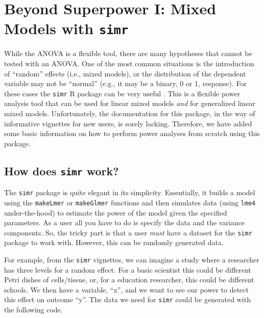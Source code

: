 \documentclass[
]{book}
\begin{document}
\hypertarget{beyond-superpower-i-mixed-models-with-simr}{%
\chapter{\texorpdfstring{Beyond Superpower I: Mixed Models with \texttt{simr}}{Beyond Superpower I: Mixed Models with simr}}\label{beyond-superpower-i-mixed-models-with-simr}}

While the ANOVA is a flexible tool, there are many hypotheses that cannot be tested with an ANOVA. One of the most common situations is the introduction of ``random'' effects (i.e., mixed models), or the distribution of the dependent variable may not be ``normal'' (e.g., it may be a binary, 0 or 1, response). For these cases the \texttt{simr} R package can be very useful \citep{Green2016}. This is a flexible power analysis tool that can be used for linear mixed models \emph{and} for generalized linear mixed models. Unfortunately, the documentation for this package, in the way of informative vignettes for new users, is sorely lacking. Therefore, we have added some basic information on how to perform power analyses from scratch using this package.

\hypertarget{how-does-simr-work}{%
\section{\texorpdfstring{How does \texttt{simr} work?}{How does simr work?}}\label{how-does-simr-work}}

The \texttt{simr} package is quite elegant in its simplicity. Essentially, it builds a model using the \texttt{makeLmer} or \texttt{makeGlmer} functions and then simulates data (using \texttt{lme4} under-the-hood) to estimate the power of the model given the specified parameters. As a user all you have to do is specify the data and the variance components. So, the tricky part is that a user \emph{must} have a dataset for the \texttt{simr} package to work with. However, this can be randomly generated data.

For example, from the \texttt{simr} vignettes, we can imagine a study where a researcher has three levels for a random effect. For a basic scientist this could be different Petri dishes of cells/tissue, or, for a education researcher, this could be different schools. We then have a variable, ``x'', and we want to see our power to detect this effect on outcome ``y''. The data we need for \texttt{simr} could be generated with the following code.
\end{document}
